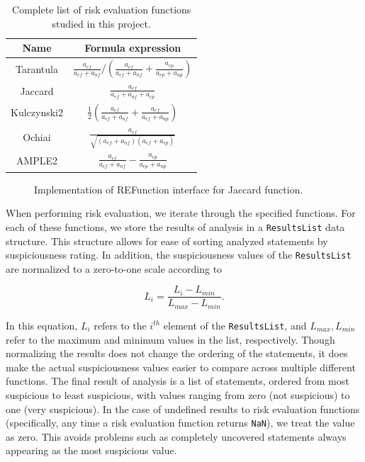 \begin{table}[tb]
\centering
{\renewcommand{\arraystretch}{2}
\begin{tabular}{|c|c|}\hline
Name & Formula expression\\\hline
Tarantula & $\displaystyle{\frac{a_{ef}}{a_{ef} + a_{nf}} / \left( \frac{a_{ef}}{a_{ef} + a_{nf}} + \frac{a_{ep}}{a_{ep} + a_{np}}\right)}$\\\hline
Jaccard & $\displaystyle{\frac{a_{ef}}{a_{ef} + a_{nf} + a_{ep}}}$\\\hline
Kulczynski2 & $\displaystyle{\frac{1}{2}\left( \frac{a_{ef}}{a_{ef} + a_{nf}} + \frac{a_{ef}}{a_{ef} + a_{np}} \right)}$\\\hline
Ochiai & $\displaystyle{ \frac{a_{ef}}{\sqrt{(a_{ef} + a_{nf})(a_{ef} + a_{ep})}}}$\\\hline
AMPLE2 & $\displaystyle{ \frac{a_{ef}}{a_{ef} + a_{nf}} - \frac{a_{ep}}{a_{ep} + a_{np}} }$\\\hline
\end{tabular}}
\caption{Complete list of risk evaluation functions studied in this project.}
\label{tab:ref}
\end{table}

\begin{figure}[tb]
\centering

\caption{Implementation of REFunction interface for Jaccard function.}
\label{fig:re}
\end{figure}

When performing risk evaluation, we iterate through the specified functions.  For each of these
functions, we store the results of analysis in a \texttt{ResultsList} data structure.  This
structure allows for ease of sorting analyzed statements by suspiciousness rating.  In addition, the
suspiciousness values of the \texttt{ResultsList} are normalized to a zero-to-one scale according to

\[ L_i = \frac{ L_i - L_{min} }{ L_{max} - L_{min} }. \]

In this equation, $L_i$ refers to the $i^{th}$ element of the \texttt{ResultsList}, and $L_{max}, L_{min}$
refer to the maximum and minimum values in the list, respectively.  Though normalizing the results does
not change the ordering of the statements, it does make the actual suspiciousness values easier to compare
across multiple different functions.  The final result of analysis is a list of statements, ordered from
most suspicious to least suspicious, with values ranging from zero (not suspicious) to one (very 
suspicious).  In the case of undefined results to risk evaluation functions (specifically, any time a
risk evaluation function returns \texttt{NaN}), we treat the value as zero.  This avoids problems such as
completely uncovered statements always appearing as the most suspicious value.

